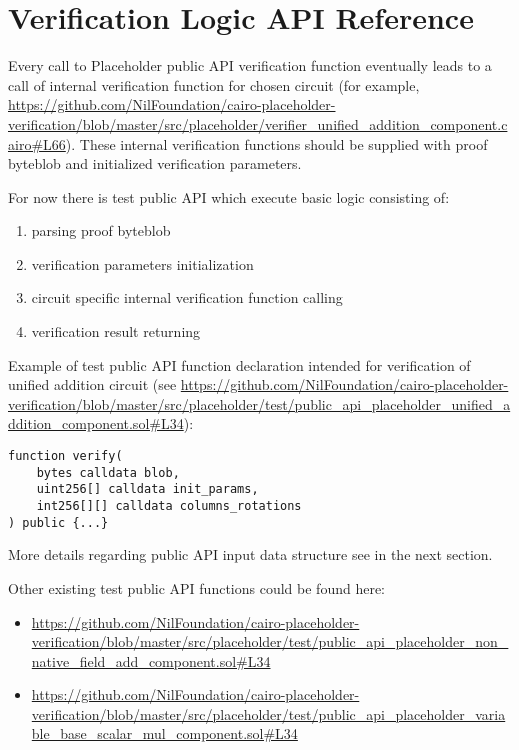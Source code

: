 \section{Verification Logic API Reference}

Every call to Placeholder public API verification function eventually leads to a 
call of internal verification function for chosen circuit
    (for example,
    \url{https://github.com/NilFoundation/cairo-placeholder-verification/blob/master/src/placeholder/verifier_unified_addition_component.cairo#L66}). 
These internal verification functions should be supplied with proof byteblob and initialized verification parameters.

For now there is test public API which execute basic logic consisting of:
\begin{enumerate}
    \item parsing proof byteblob
    \item verification parameters initialization
    \item circuit specific internal verification function calling
    \item verification result returning
\end{enumerate}

Example of test public API function declaration intended for verification of unified addition circuit
 (see
 \url{https://github.com/NilFoundation/cairo-placeholder-verification/blob/master/src/placeholder/test/public_api_placeholder_unified_addition_component.sol#L34}):

\begin{verbatim}
function verify(
    bytes calldata blob,
    uint256[] calldata init_params,
    int256[][] calldata columns_rotations
) public {...}
\end{verbatim}

More details regarding public API input data structure see in the next section.

Other existing test public API functions could be found here:
\begin{itemize}
    \item
        \url{https://github.com/NilFoundation/cairo-placeholder-verification/blob/master/src/placeholder/test/public_api_placeholder_non_native_field_add_component.sol#L34}
    \item
        \url{https://github.com/NilFoundation/cairo-placeholder-verification/blob/master/src/placeholder/test/public_api_placeholder_variable_base_scalar_mul_component.sol#L34}
\end{itemize}
